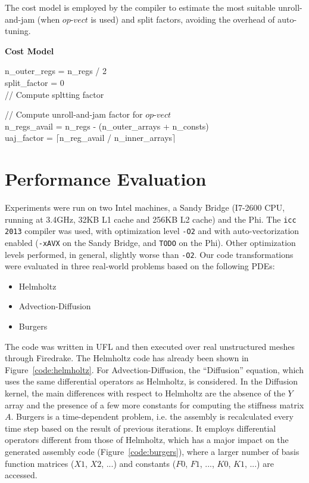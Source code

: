 \documentclass[conference]{IEEEtran}
\begin{document}
\begin{algorithm}[t]
\caption{The cost model is employed by the compiler to estimate the most suitable unroll-and-jam (when $op$-$vect$ is used) and split factors, avoiding the overhead of auto-tuning.}
\label{algo:applyCostModel}
  \textbf{Cost Model}\\

n\_outer\_regs = n\_regs / 2 \\
split\_factor = 0 \\ 
// Compute spltting factor \\

// Compute unroll-and-jam factor for $op$-$vect$ \\
n\_regs\_avail = n\_regs - (n\_outer\_arrays + n\_consts)\\
uaj\_factor = $\lceil$n\_reg\_avail / n\_inner\_arrays$\rceil$ \\
\end{algorithm}


\section{Performance Evaluation}
\label{sec:perf-results}

Experiments were run on two Intel machines, a Sandy Bridge (I7-2600 CPU, running at 3.4GHz, 32KB L1 cache and 256KB L2 cache) and the Phi. The \texttt{icc 2013} compiler was used, with optimization level \texttt{-O2} and with auto-vectorization enabled (\texttt{-xAVX} on the Sandy Bridge, and \texttt{TODO} on the Phi). Other optimization levels performed, in general, slightly worse than \texttt{-O2}. Our code transformations were evaluated in three real-world problems based on the following PDEs:
\begin{itemize}
\item Helmholtz
\item Advection-Diffusion
\item Burgers
\end{itemize}
The code was written in UFL and then executed over real unstructured meshes through Firedrake. The Helmholtz code has already been shown in Figure~\ref{code:helmholtz}. For Advection-Diffusion, the ``Diffusion'' equation, which uses the same differential operators as Helmholtz, is considered. In the Diffusion kernel, the main differences with respect to Helmholtz are the absence of the $Y$ array and the presence of a few more constants for computing the stiffness matrix $A$. Burgers is a time-dependent problem, i.e. the assembly is recalculated every time step based on the result of previous iterations. It employs differential operators different from those of Helmholtz, which has a major impact on the generated assembly code (Figure~\ref{code:burgers}), where a larger number of basis function matrices ($X1$, $X2$, ...) and constants ($F0$, $F1$, ..., $K0$, $K1$, ...) are accessed. 
\end{document}
